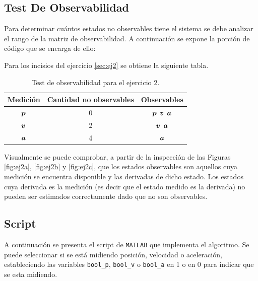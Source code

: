 	\subsection{Test De Observabilidad}
		Para determinar cuántos estados no observables tiene el sistema se debe analizar el rango de la 
		matriz de observabilidad. A continuación se expone la porción de código que se encarga de ello:
		

		Para los incisios del ejercicio \ref{sec:ej2} se obtiene la siguiente tabla.
		\begin{table}[h!]
			\centering
			\begin{tabular}{ccc}
				\toprule
				Medición	& Cantidad no observables	& Observables\\
				\midrule
				$\boldsymbol{p}$	& 0				& $\boldsymbol{p}$ $\boldsymbol{v}$ $\boldsymbol{a}$\\
				$\boldsymbol{v}$	& 2				& $\boldsymbol{v}$ $\boldsymbol{a}$ \\
				$\boldsymbol{a}$	& 4				& $\boldsymbol{a}$\\

				\bottomrule
			\end{tabular}
				\caption{Test de observabilidad para el ejercicio 2.}
				\label{tab:obs_ej2}
		\end{table}

		Visualmente se puede comprobar, a partir de la inspección de las Figuras \ref{fig:ej2a}, \ref{fig:ej2b} y \ref{fig:ej2c}, que los estados observables son aquellos cuya medición se encuentra disponible y las derivadas de dicho estado. Los estados cuya derivada es la medición (es decir que el estado medido es la derivada) no pueden ser estimados correctamente dado que no son observables.

	\subsection{Script}
	
	A continuación se presenta el script de \texttt{MATLAB} que implementa el algoritmo. Se puede seleccionar si se está midiendo posición, velocidad o aceleración, estableciendo las variables \texttt{bool\_p}, \texttt{bool\_v} o \texttt{bool\_a} en 1 o en 0 para indicar que se esta midiendo.\\
	
	
